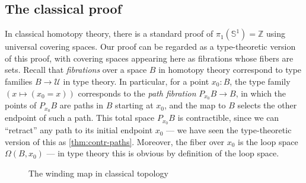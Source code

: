 \documentclass[10pt,a4paper]{article}
\providecommand{\index}[1]{}
\newcommand{\UU}{\ensuremath{\mathcal{U}}\xspace}
\let\type\UU
\newcommand{\Sn}{\mathbb{S}}
\newcommand{\base}{\ensuremath{\mathsf{base}}\xspace}
\newcommand{\Z}{\ensuremath{\mathbb{Z}}\xspace}
\theoremstyle{definition}
\theoremstyle{remark}
\numberwithin{equation}{section}
\begin{document}
\subsection{The classical proof}
\label{sec:pi1s1-classical-proof}

\index{classical!homotopy theory|(}%
In classical homotopy theory, there is a standard proof of $\pi_1(\Sn^1)=\Z$ using universal covering spaces.
Our proof can be regarded as a type-theoretic version of this proof, with covering spaces appearing here as fibrations whose fibers are sets.
\index{fibration}%
\index{total!space}%
Recall that \emph{fibrations} over a space $B$ in homotopy theory correspond to type families $B\to\type$ in type theory.
\index{path!fibration}%
\index{fibration!of paths}%
In particular, for a point $x_0:B$, the type family $(x\mapsto (x_0=x))$ corresponds to the \emph{path fibration} $P_{x_0} B \to B$, in which the points of $P_{x_0} B$ are paths in $B$ starting at $x_0$, and the map to $B$ selects the other endpoint of such a path.
This total space $P_{x_0} B$ is contractible, since we can ``retract'' any path to its initial endpoint $x_0$ --- we have seen the type-theoretic version of this as \cref{thm:contr-paths}.
Moreover, the fiber over $x_0$ is the loop space\index{loop space} $\Omega(B,x_0)$ --- in type theory this is obvious by definition of the loop space.

\begin{figure}\centering
  \caption{The winding map in classical topology}\label{fig:winding}
\end{figure}
\end{document}
